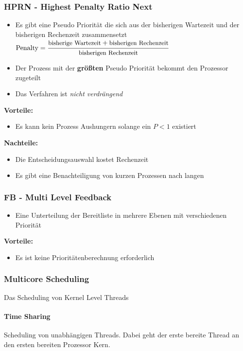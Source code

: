 \documentclass[10pt,a4paper]{article}
\begin{document}
\begin{multicols*}{4}
\subsubsection*{HPRN - Highest Penalty Ratio Next}
\begin{itemize}
	\item Es gibt eine Pseudo Priorität die sich aus der bisherigen Wartezeit und der bisherigen Rechenzeit
	      zusammensetzt
	      \(\text{Penalty} = \cfrac{\text{\small bisherige Wartezeit} + \text{\small bisherigen Rechenzeit}}{\text{\small bisherigen Rechenzeit}}\)
	\item Der Prozess mit der \textbf{größten} Pseudo Priorität bekommt den Prozessor zugeteilt
	\item Das Verfahren ist \emph{nicht verdrängend}
\end{itemize}
\textbf{\small Vorteile:}\hfill
\begin{itemize}
	\item Es kann kein Prozess Aushungern solange ein \(P < 1\) existiert
\end{itemize}
\textbf{\small Nachteile:}\hfill
\begin{itemize}
	\item Die Entscheidungsauswahl kostet Rechenzeit
	\item Es gibt eine Benachteiligung von kurzen Prozessen nach langen
\end{itemize}
\subsubsection*{FB - Multi Level Feedback}
\begin{itemize}
	\item Eine Unterteilung der Bereitliste in mehrere Ebenen mit verschiedenen Priorität
\end{itemize}
\textbf{\small Vorteile:}\hfill
\begin{itemize}
	\item Es ist keine Prioritätenberechnung erforderlich
\end{itemize}
\subsubsection{Multicore Scheduling}
Das Scheduling von Kernel Level Threads
\paragraph{Time Sharing} Scheduling von unabhängigen Threads. Dabei geht der erste bereite Thread an den ersten
bereiten Prozessor Kern.

\end{multicols*}
\end{document}
